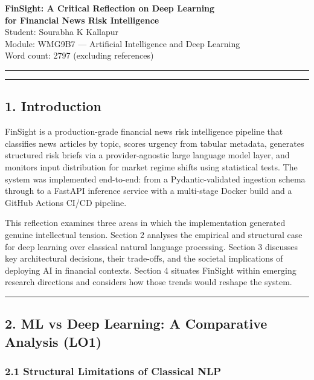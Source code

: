 \documentclass[11pt,a4paper]{article}
\begin{document}
\begin{center}
{\Large\bfseries FinSight: A Critical Reflection on Deep Learning\\
for Financial News Risk Intelligence}\\[8pt]
{\normalsize Student: Sourabha K Kallapur}\\
{\normalsize Module: WMG9B7 --- Artificial Intelligence and Deep Learning}\\
{\normalsize Word count: 2797 (excluding references)}\\[6pt]
\noindent\rule{\linewidth}{0.8pt}
\end{center}

\noindent\rule{\linewidth}{0.4pt}

\subsection*{1. Introduction}

FinSight is a production-grade financial news risk intelligence pipeline that classifies news articles by topic, scores urgency from tabular metadata, generates structured risk briefs via a provider-agnostic large language model layer, and monitors input distribution for market regime shifts using statistical tests. The system was implemented end-to-end: from a Pydantic-validated ingestion schema through to a FastAPI inference service with a multi-stage Docker build and a GitHub Actions CI/CD pipeline.

This reflection examines three areas in which the implementation generated genuine intellectual tension. Section 2 analyses the empirical and structural case for deep learning over classical natural language processing. Section 3 discusses key architectural decisions, their trade-offs, and the societal implications of deploying AI in financial contexts. Section 4 situates FinSight within emerging research directions and considers how those trends would reshape the system.

\noindent\rule{\linewidth}{0.4pt}

\subsection*{2. ML vs Deep Learning: A Comparative Analysis (LO1)}

\subsubsection*{2.1 Structural Limitations of Classical NLP}
\end{document}
